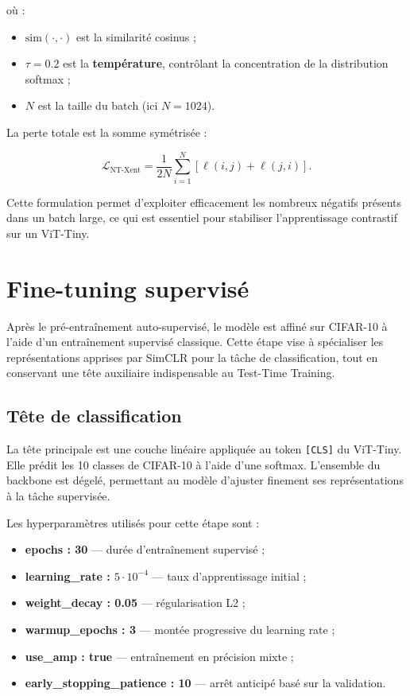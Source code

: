 \documentclass[12pt,a4paper]{report}
\begin{document}
	
	où :
	\begin{itemize}
		\item $\mathrm{sim}(\cdot,\cdot)$ est la similarité cosinus ;
		\item $\tau = 0.2$ est la \textbf{température}, contrôlant la concentration de la distribution softmax ;
		\item $N$ est la taille du batch (ici $N=1024$).
	\end{itemize}
	
	La perte totale est la somme symétrisée :
	
	
	\[
	\mathcal{L}_{\text{NT-Xent}} = \frac{1}{2N} \sum_{i=1}^{N} \left[ \ell(i,j) + \ell(j,i) \right].
	\]
	
	
	
	Cette formulation permet d’exploiter efficacement les nombreux négatifs présents dans un batch large, ce qui est essentiel pour stabiliser l’apprentissage contrastif sur un ViT-Tiny.
	
	
	\section{Fine-tuning supervisé}
	
	Après le pré-entraînement auto-supervisé, le modèle est affiné sur CIFAR-10 à l’aide d’un entraînement supervisé classique. 
	Cette étape vise à spécialiser les représentations apprises par SimCLR pour la tâche de classification, tout en conservant une tête auxiliaire indispensable au Test-Time Training.
	
	\subsection{Tête de classification}
	
	La tête principale est une couche linéaire appliquée au token \texttt{[CLS]} du ViT-Tiny.  
	Elle prédit les 10 classes de CIFAR-10 à l’aide d’une softmax.  
	L’ensemble du backbone est dégelé, permettant au modèle d’ajuster finement ses représentations à la tâche supervisée.
	
	Les hyperparamètres utilisés pour cette étape sont :
	\begin{itemize}
		\item \textbf{epochs : 30} — durée d’entraînement supervisé ;
		\item \textbf{learning\_rate : $5\cdot10^{-4}$} — taux d’apprentissage initial ;
		\item \textbf{weight\_decay : 0.05} — régularisation L2 ;
		\item \textbf{warmup\_epochs : 3} — montée progressive du learning rate ;
		\item \textbf{use\_amp : true} — entraînement en précision mixte ;
		\item \textbf{early\_stopping\_patience : 10} — arrêt anticipé basé sur la validation.
	\end{itemize}
	
\end{document}
